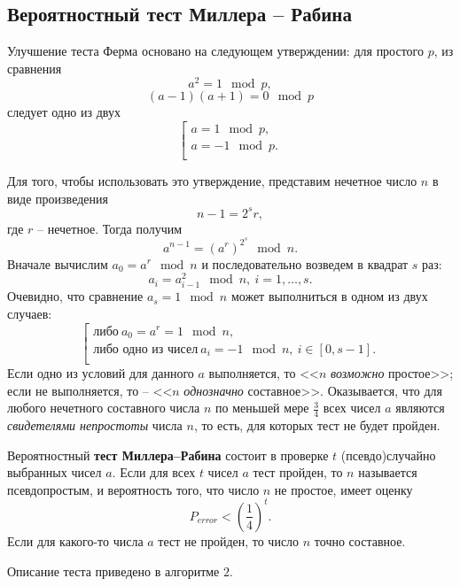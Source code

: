﻿\subsection{Вероятностный тест Миллера -- Рабина}

Улучшение теста Ферма основано на следующем утверждении: для простого $p$, из сравнения
    \[ a^2 = 1 \mod p, \]
    \[ (a-1)(a+1) = 0 \mod p \]
следует одно из двух
\[ \left[ \begin{array}{l}
     a = 1 \mod p, \\
     a = -1 \mod p. \\
\end{array} \right. \]

Для того, чтобы использовать это утверждение, представим нечетное число $n$  в виде произведения
    \[ n-1 = 2^s r, \]
где $r$ -- нечетное. Тогда получим
    \[ a^{n-1} = (a^r)^{2^s} \mod n. \]
Вначале вычислим $a_0 = a^r \mod n$ и последовательно возведем в квадрат $s$ раз:
    \[ a_i = a_{i-1}^2 \mod n, ~ i = 1, \dots, s. \]
Очевидно, что сравнение $a_s = 1 \mod n$ может выполниться в одном из двух случаев:
\[ \left[ \begin{array}{l}
    \text{либо}~ a_0 = a^r = 1 \mod n, \\
    \text{либо одно из чисел}~ a_i = -1 \mod n, ~ i \in [0, s-1]. \\
\end{array} \right. \]
Если одно из условий для данного $a$  выполняется, то  <<$n$ \emph{возможно} простое>>; если не выполняется, то -- <<$n$ \emph{однозначно} составное>>. Оказывается, что для любого нечетного составного числа $n$ по меньшей мере $\frac{3}{4}$ всех чисел $a$ являются \emph{свидетелями непростоты} числа $n$, то есть, для которых тест не будет пройден.

Вероятностный \textbf{тест Миллера--Рабина} состоит в проверке $t$ (псевдо)случайно выбранных чисел $a$. Если для всех $t$ чисел $a$ тест пройден, то $n$ называется псевдопростым, и вероятность того, что число $n$ не простое, имеет оценку
    \[ P_{error} < \left( \frac{1}{4} \right)^t. \]
Если для какого-то числа $a$ тест не пройден, то число $n$ точно составное.

Описание теста приведено в алгоритме $2$.

